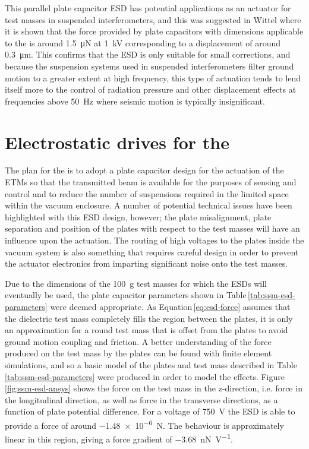 This parallel plate capacitor \gls{ESD} has potential applications as an actuator for test masses in suspended interferometers, and this was suggested in Wittel \etal{} \cite{Wittel2015} where it is shown that the force provided by plate capacitors with dimensions applicable to the \AEIPROTOTYPE{} is around \SI{1.5}{\micro\newton} at \SI{1}{\kilo\volt} corresponding to a displacement of around \SI{0.3}{\micro\meter}. This confirms that the \gls{ESD} is only suitable for small corrections, and because the suspension systems used in suspended interferometers filter ground motion to a greater extent at high frequency, this type of actuation tends to lend itself more to the control of radiation pressure and other displacement effects at frequencies above \SI{50}{\hertz} where seismic motion is typically insignificant.

\section{Electrostatic drives for the \SSMEXPT{}}
The plan for the \SSMEXPT{} is to adopt a plate capacitor design for the actuation of the \glspl{ETM} so that the transmitted beam is available for the purposes of sensing and control and to reduce the number of suspensions required in the limited space within the vacuum enclosure. A number of potential technical issues have been highlighted with this \gls{ESD} design, however; the plate misalignment, plate separation and position of the plates with respect to the test masses will have an influence upon the actuation. The routing of high voltages to the plates inside the vacuum system is also something that requires careful design in order to prevent the actuator electronics from imparting significant noise onto the test masses. 

Due to the dimensions of the \SI{100}{\gram} test masses for which the \glspl{ESD} will eventually be used, the plate capacitor parameters shown in Table\,\ref{tab:ssm-esd-parameters} were deemed appropriate. As Equation\,\ref{eq:esd-force} assumes that the dielectric test mass completely fills the region between the plates, it is only an approximation for a round test mass that is offset from the plates to avoid ground motion coupling and friction. A better understanding of the force produced on the test mass by the plates can be found with finite element simulations, and so a basic model of the plates and test mass described in Table\,\ref{tab:ssm-esd-parameters} were produced in order to model the effects. Figure\,\ref{fig:ssm-esd-ansys} shows the force on the test mass in the z-direction, i.e. force in the longitudinal direction, as well as force in the transverse directions, as a function of plate potential difference. For a voltage of \SI{750}{\volt} the \gls{ESD} is able to provide a force of around \SI{-1.48e-6}{\newton}. The behaviour is approximately linear in this region, giving a force gradient of \SI{-3.68}{\nano\newton\per\volt}.

